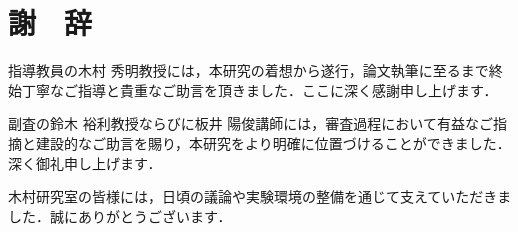 ﻿%
\chapter*{謝　辞}

指導教員の木村 秀明教授には，本研究の着想から遂行，論文執筆に至るまで終始丁寧なご指導と貴重なご助言を頂きました．ここに深く感謝申し上げます．

副査の鈴木 裕利教授ならびに板井 陽俊講師には，審査過程において有益なご指摘と建設的なご助言を賜り，本研究をより明確に位置づけることができました．深く御礼申し上げます．

木村研究室の皆様には，日頃の議論や実験環境の整備を通じて支えていただきました．誠にありがとうございます．

